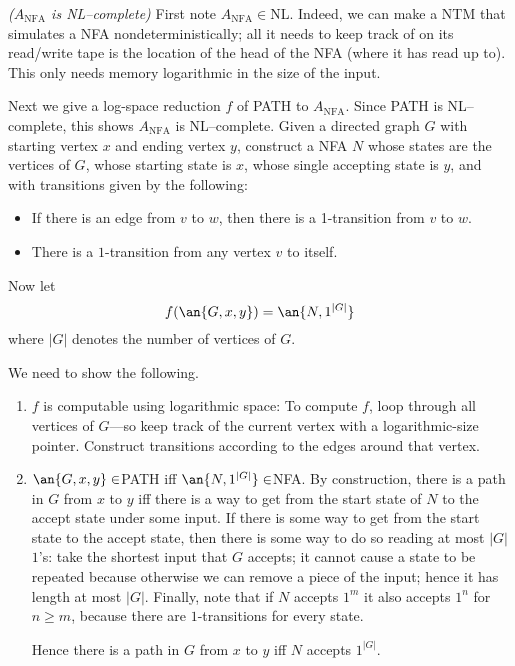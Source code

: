 \pagebreak

\begin{problem}{\it($A_{\text{NFA}}$ is NL--complete)}
First note $A_{\text{NFA}}\in$NL. Indeed, we can make a NTM that simulates a NFA nondeterministically; all it needs to keep track of on its read/write tape is the location of the head of the NFA (where it has read up to). This only needs memory logarithmic in the size of the input.

Next we give a log-space reduction $f$ of PATH to $A_{\text{NFA}}$. Since PATH is NL--complete, this shows $A_{\text{NFA}}$ is NL--complete. Given a directed graph $G$ with starting vertex $x$ and ending vertex $y$, construct a NFA $N$ whose states are the vertices of $G$, whose starting state is $x$, whose single accepting state is $y$, and with transitions given by the following:
\begin{itemize}
\item
If there is an edge from $v$ to $w$, then there is a 1-transition from $v$ to $w$.
\item
There is a $1$-transition from any vertex $v$ to itself.
\end{itemize}
Now let
\[
f(\an{G,x,y})=\an{N,1^{|G|}}
\]
where $|G|$ denotes the number of vertices of $G$.

We need to show the following.
\begin{enumerate}
\item
$f$ is computable using logarithmic space: To compute $f$, loop through all vertices of $G$---so keep track of the current vertex with a logarithmic-size pointer. Construct transitions according to the edges around that vertex.
\item
$\an{G,x,y}\in$PATH iff $\an{N,1^{|G|}}\in$NFA.  By construction, there is a path in $G$ from $x$ to $y$ iff there is a way to get from the start state of $N$ to the accept state under some input. If there is some way to get from the start state to the accept state, then there is some way to do so reading at most $|G|$ $1$'s: take the shortest input that $G$ accepts; it cannot cause a state to be repeated because otherwise we can remove a piece of the input; hence it has length at most $|G|$. Finally, note that if $N$ accepts $1^m$ it also accepts $1^n$ for $n\ge m$, because there are $1$-transitions for every state.

Hence there is a path in $G$ from $x$ to $y$ iff $N$ accepts $1^{|G|}$.
\end{enumerate}


\end{problem}

